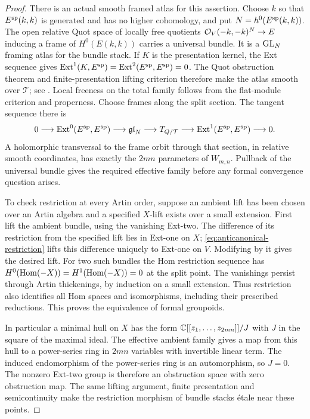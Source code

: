 \begin{proof}
There is an actual smooth framed atlas for this assertion.
Choose $k$ so that $E^{\rm sp}(k,k)$ is generated and has no
higher cohomology, and put $N=h^0(E^{\rm sp}(k,k))$.
The open relative Quot space of locally free quotients
$\mathcal O_V(-k,-k)^N\to E$ inducing a frame of $H^0(E(k,k))$
carries a universal bundle. It is a $\operatorname{GL}_N$ framing atlas for
the bundle stack. If $K$ is the presentation kernel, the Ext
sequence gives $\operatorname{Ext}^1(K,E^{\rm sp})=\operatorname{Ext}^2(E^{\rm sp},E^{\rm sp})=0$.
The Quot obstruction theorem and finite-presentation lifting
criterion therefore make the atlas smooth over $\mathcal T$;
see \cite[Tags 09TU, 0CZU and 02H6]{Stacks}. Local freeness
on the total family follows from the flat-module criterion
\cite[Tag 00MH]{Stacks} and properness. Choose frames along
the split section. The tangent sequence there is
\[
 0\longrightarrow\operatorname{Ext}^0(E^{\rm sp},E^{\rm sp})
 \longrightarrow\mathfrak{gl}_N
 \longrightarrow T_{Q/\mathcal T}
 \longrightarrow\operatorname{Ext}^1(E^{\rm sp},E^{\rm sp})
 \longrightarrow0.
\]
A holomorphic transversal to the frame orbit through that
section, in relative smooth coordinates, has exactly the
$2mn$ parameters of $W_{m,n}$. Pullback of the universal
bundle gives the required effective family before any
formal convergence question arises.

To check restriction at every Artin order, suppose an ambient
lift has been chosen over an Artin algebra and a specified
$X$-lift exists over a small extension. First lift the ambient
bundle, using the vanishing Ext-two. The difference of its
restriction from the specified lift lies in Ext-one on $X$;
\eqref{eq:anticanonical-restriction} lifts this difference
uniquely to Ext-one on $V$. Modifying by it gives the desired
lift. For two such bundles the Hom restriction sequence has
$H^0(\operatorname{Hom}(-X))=H^1(\operatorname{Hom}(-X))=0$ at the split point.
The vanishings persist through Artin thickenings, by induction
on a small extension. Thus restriction also identifies all
Hom spaces and isomorphisms, including their prescribed
reductions. This proves the equivalence of formal groupoids.

In particular a minimal hull on $X$ has the form
$\mathbb C[[z_1,\ldots,z_{2mn}]]/J$ with $J$ in the square of the
maximal ideal. The effective ambient family gives a map from
this hull to a power-series ring in $2mn$ variables with
invertible linear term. The induced endomorphism of the
power-series ring is an automorphism, so $J=0$.
The nonzero Ext-two group is therefore an obstruction space
with zero obstruction map. The same lifting argument,
finite presentation and semicontinuity make the restriction
morphism of bundle stacks étale near these points.


\end{proof}
